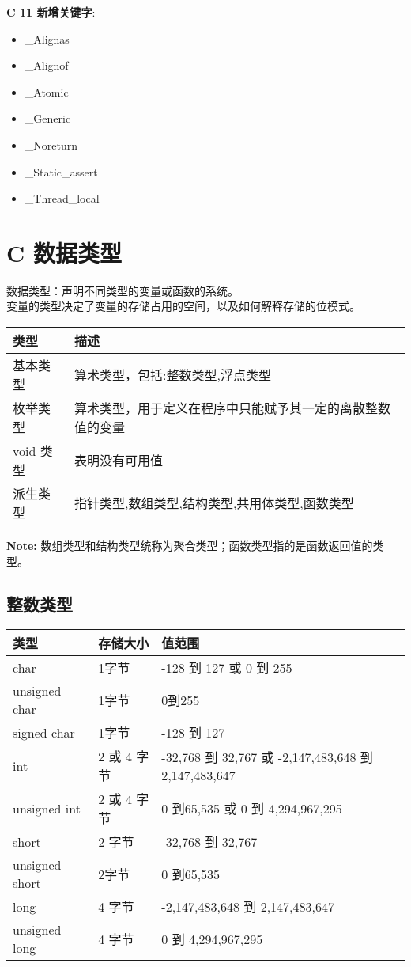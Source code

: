 \documentclass[UTF8]{ctexart}
\begin{document}
	\textbf{C 11 新增关键字}:
	\begin{framed}
		\begin{itemize}
			\item \_Alignas
			\item \_Alignof
			\item \_Atomic
			\item \_Generic
			\item \_Noreturn
			\item \_Static\_assert
			\item \_Thread\_local
		\end{itemize}
	\end{framed}

	\clearpage
	\section{C 数据类型}
	数据类型：声明不同类型的变量或函数的系统。\\变量的类型决定了变量的存储占用的空间，以及如何解释存储的位模式。
	\begin{tabular*}{\linewidth}{l|l}
		\toprule
		类型 & 描述 \\
		\midrule
		基本类型 & 算术类型，包括:整数类型,浮点类型 \\
		枚举类型 & 算术类型，用于定义在程序中只能赋予其一定的离散整数值的变量\\
		void 类型 & 表明没有可用值\\
		派生类型 & 指针类型,数组类型,结构类型,共用体类型,函数类型\\
	\bottomrule
	\end{tabular*}
	\begin{framed}
		\textbf{Note:} 数组类型和结构类型统称为聚合类型；函数类型指的是函数返回值的类型。
	\end{framed}
	
	\subsection{整数类型}
	\begin{tabular*}{\linewidth}{l|l|p{18em}}
		\toprule
		类型 & 存储大小 & 值范围 \\
		\midrule
		char & 1字节 & -128 到 127 或 0 到 255\\
		unsigned char & 1字节 & 0到255\\
		signed char & 1字节 & -128 到 127 \\
		int & 2 或 4 字节 & -32,768 到 32,767 或 -2,147,483,648 到 2,147,483,647\\
		unsigned int & 2 或 4 字节 & 0 到65,535 或 0 到 4,294,967,295\\
		short & 2 字节 & -32,768 到 32,767\\
		unsigned short & 2字节 & 0 到65,535\\
		long & 4 字节 & -2,147,483,648 到 2,147,483,647\\
		unsigned long & 4 字节 & 0 到 4,294,967,295\\
		\bottomrule
	\end{tabular*}
	
\end{document}
